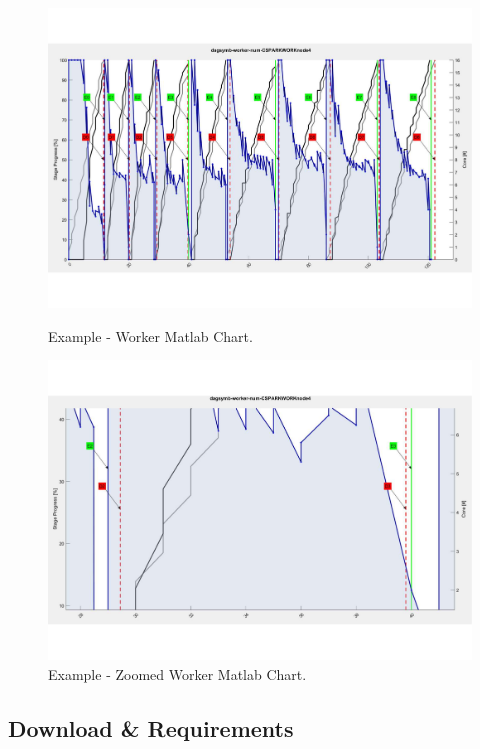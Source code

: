 \begin{figure}[t]
	\begin{minipage}{0.5\columnwidth}
		\includegraphics[width=\columnwidth]{images/plot_worker.pdf}
		\caption{Example - Worker Matlab Chart.}
		\label{fig:plot_worker}
	\end{minipage}
	\begin{minipage}{0.5\columnwidth}
		\includegraphics[width=\columnwidth]{images/plot_worker_zoom.pdf}
		\caption{Example - Zoomed Worker Matlab Chart.}
		\label{fig:plot_worker_zoom}
	\end{minipage}
\end{figure}
 
\hypertarget{download-requirements}{%
\subsection{Download \& Requirements}\label{download-requirements}}

